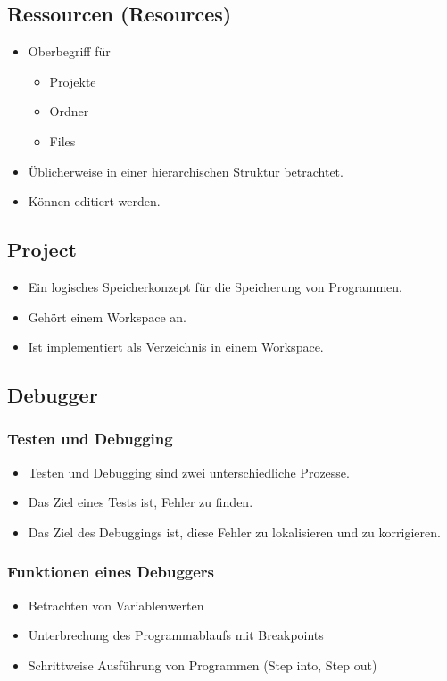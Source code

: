 \begin{multicols}{2}
\subsection{Ressourcen (Resources)}
\begin{itemize}
	\item Oberbegriff für
	\begin{itemize}
		\item Projekte
		\item Ordner
		\item Files
	\end{itemize}
	\item Üblicherweise in einer hierarchischen Struktur betrachtet.
	\item Können editiert werden.
\end{itemize}
\vfill\null
\columnbreak
\subsection{Project}
\begin{itemize}
	\item Ein logisches Speicherkonzept für die Speicherung von Programmen.
	\item Gehört einem Workspace an.
	\item Ist implementiert als Verzeichnis in einem Workspace.
\end{itemize}
\end{multicols}

\subsection{Debugger}

\begin{multicols}{2}
\subsubsection{Testen und Debugging}
\begin{itemize}
	\item Testen und Debugging sind zwei unterschiedliche Prozesse.
	\item Das Ziel eines Tests ist, Fehler zu finden.
	\item Das Ziel des Debuggings ist, diese Fehler zu lokalisieren und zu korrigieren.
\end{itemize}
\vfill\null
\columnbreak
\subsubsection{Funktionen eines Debuggers}
\begin{itemize}
	\item Betrachten von Variablenwerten
	\item Unterbrechung des Programmablaufs mit Breakpoints
	\item Schrittweise Ausführung von Programmen (Step into, Step out)
\end{itemize}
\end{multicols}

